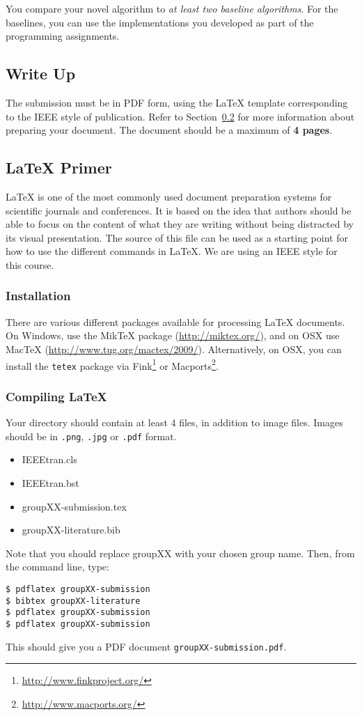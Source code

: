 You compare your novel algorithm to \emph{at least two baseline
  algorithms}. For the baselines, you can use the implementations you
developed as part of the programming assignments.


\subsection{Write Up}

The submission must be in PDF form, using the \LaTeX{} template
corresponding to the IEEE style of publication. Refer to
Section~\ref{sec:latex-primer} for more information about preparing
your document. The document should be a maximum of {\bf 4 pages}.

\subsection{\LaTeX{} Primer}
\label{sec:latex-primer}

\LaTeX{} is one of the most commonly used document preparation systems
for scientific journals and conferences. It is based on the idea
that authors should be able to focus on the content of what they are
writing without being distracted by its visual presentation.
The source of this file can be used as a starting point for how to use
the different commands in \LaTeX{}. We are using an IEEE style for
this course.

\subsubsection{Installation}

There are various different packages available for processing \LaTeX{}
documents.
On Windows, use the Mik\TeX{} package (\url{http://miktex.org/}), and
on OSX use MacTeX
(\url{http://www.tug.org/mactex/2009/}). Alternatively, on OSX, you
can install the \texttt{tetex} package via
Fink\footnote{\url{http://www.finkproject.org/}} or 
Macports\footnote{\url{http://www.macports.org/}}.

\subsubsection{Compiling \LaTeX{}}
Your directory should contain at least 4 files, in addition to image
files. Images should be in \texttt{.png}, \texttt{.jpg} or
\texttt{.pdf} format.
\begin{itemize}
\item IEEEtran.cls
\item IEEEtran.bst
\item groupXX-submission.tex
\item groupXX-literature.bib
\end{itemize}
Note that you should replace groupXX with your chosen group name.
Then, from the command line, type:
\begin{verbatim}
$ pdflatex groupXX-submission
$ bibtex groupXX-literature
$ pdflatex groupXX-submission
$ pdflatex groupXX-submission
\end{verbatim}
This should give you a PDF document \texttt{groupXX-submission.pdf}.

